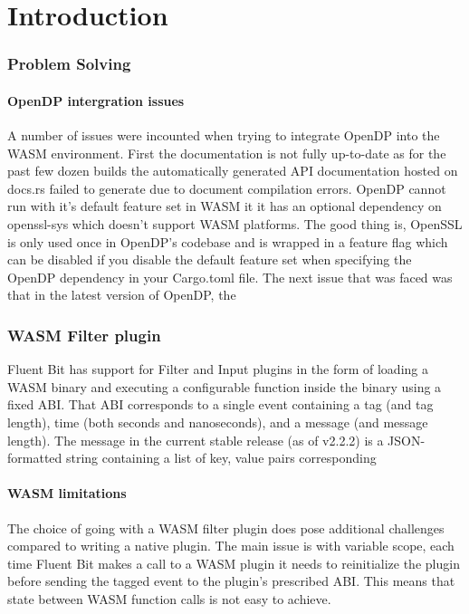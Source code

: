 \chapter{Introduction\label{chap:introduction}}
\subsection{Problem Solving}
\subsubsection{OpenDP intergration issues}
A number of issues were incounted when trying to integrate OpenDP into the WASM environment. First the documentation is not fully up-to-date as for the past few dozen builds the automatically generated API documentation hosted on docs.rs failed to generate due to document compilation errors. OpenDP cannot run with it's default feature set in WASM it it has an optional dependency on openssl-sys which doesn't support WASM platforms. The good thing is, OpenSSL is only used once in OpenDP's codebase and is wrapped in a feature flag which can be disabled if you disable the default feature set when specifying the OpenDP dependency in your Cargo.toml file. The next issue that was faced was that in the latest version of OpenDP, the 
\subsection{WASM Filter plugin}
Fluent Bit has support for Filter and Input plugins in the form of loading a WASM binary and executing a configurable function inside the binary using a fixed ABI. That ABI corresponds to a single event containing a tag (and tag length), time (both seconds and nanoseconds), and a message (and message length). The message in the current stable release (as of v2.2.2) is a JSON-formatted string containing a list of key, value pairs corresponding 

\subsubsection{WASM limitations}
The choice of going with a WASM filter plugin does pose additional challenges compared to writing a native plugin. The main issue is with variable scope, each time Fluent Bit makes a call to a WASM plugin it needs to reinitialize the plugin before sending the tagged event to the plugin's prescribed ABI. This means that state between WASM function calls is not easy to achieve. 
